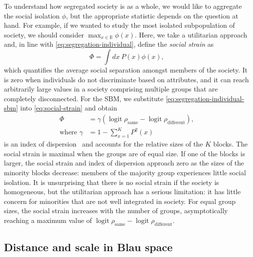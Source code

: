 \documentclass{scrartcl}
\DeclareMathOperator{\logit}{logit}
\newcommand{\blauspace}{\mathbb{B}}
\begin{document}
\begin{refsection}
To understand how segregated society is as a whole, we would like to aggregate the social isolation $\phi$, but the appropriate statistic depends on the question at hand. For example, if we wanted to study the most isolated subpopulation of society, we should consider $\max_{x\in\blauspace}\phi(x)$. Here, we take a utilitarian approach and, in line with \cref{eq:segregation-individual}, define the \emph{social strain} as
\begin{equation}
    \Phi = \int dx\ P(x) \phi(x),\label{eq:social-strain}
\end{equation}
which quantifies the average social separation amongst members of the society. It is zero when individuals do not discriminate based on attributes, and it can reach arbitrarily large values in a society comprising multiple groups that are completely disconnected. For the SBM, we substitute \cref{eq:segregation-individual-sbm} into \cref{eq:social-strain} and obtain
\begin{align}
    \Phi&= \gamma\left(\logit\rho_\mathrm{same}-\logit\rho_\mathrm{different}\right),\nonumber \\
    \text{where }\gamma&=1 - \sum_{x=1}^K P^2(x) \label{eq:segregation-distributional-factor}
\end{align}
is an index of dispersion~\cite{Moody2001} and accounts for the relative sizes of the $K$ blocks. The social strain is maximal when the groups are of equal size. If one of the blocks is larger, the social strain and index of dispersion approach zero as the sizes of the minority blocks decrease: members of the majority group experiences little social isolation. It is unsurprising that there is no social strain if the society is homogeneous, but the utilitarian approach has a serious limitation: it has little concern for minorities that are not well integrated in society. For equal group sizes, the social strain increases with the number of groups, asymptotically reaching a maximum value of $\logit\rho_\mathrm{same}-\logit\rho_\mathrm{different}$.

\subsection{Distance and scale in Blau space\label{sec:segregation-distance}}


\end{refsection}
\end{document}
